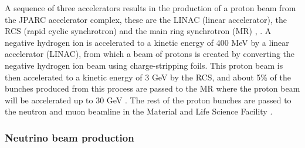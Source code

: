 A sequence of three accelerators results in the production of a proton beam from the JPARC accelerator complex, these are the LINAC (linear accelerator), the RCS (rapid cyclic synchrotron) and the main ring synchrotron (MR) \cite{hasegawa2010status}, \cite{sato2018high}. A negative hydrogen ion is accelerated to a kinetic energy of 400 MeV by a linear accelerator (LINAC), from which a beam of protons is created by converting the negative hydrogen ion beam using charge-stripping foils. This proton beam is then accelerated to a kinetic energy of 3 GeV by the RCS, and about 5\% of the bunches produced from this process are passed to the MR where the proton beam will be accelerated up to 30 GeV \cite{hasegawa2017performance}. The rest of the proton bunches are passed to the neutron and muon beamline in the Material and Life Science Facility \cite{higemoto2017materials}. 

\subsubsection{Neutrino beam production}

